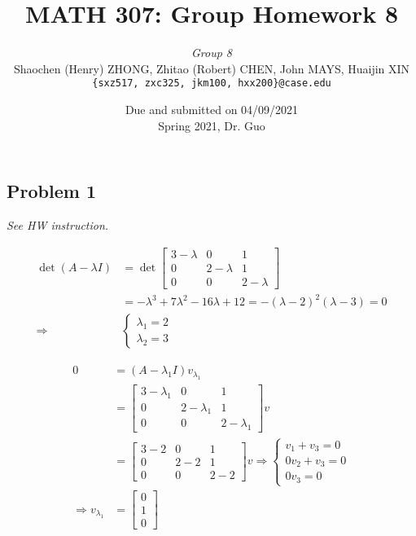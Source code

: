 \documentclass[11pt]{article}
\newcommand{\ilc}{\texttt}
\providecommand{\qbm}[1]{\begin{bmatrix} #1 \end{bmatrix}}
\begin{document}
\title{\textbf{MATH 307: Group Homework 8}}


\author{\textit{Group 8}\\
Shaochen (Henry) ZHONG, Zhitao (Robert) CHEN, John MAYS, Huaijin XIN\\ \ilc{\{sxz517, zxc325, jkm100, hxx200\}@case.edu}}

\date{Due and submitted on 04/09/2021 \\ Spring 2021, Dr. Guo}
\maketitle




\subsection*{Problem 1}
\textit{See HW instruction.}\newline

\begin{align*}
    \det(A - \lambda I) &= \det \qbm{3- \lambda & 0 & 1 \\ 0 & 2-\lambda & 1 \\ 0 & 0 & 2-\lambda} \\
    &= -\lambda^3 + 7 \lambda ^2 - 16\lambda + 12 = -(\lambda - 2)^2 (\lambda - 3) = 0 \\
    \Longrightarrow& \begin{cases}
        \lambda_1 = 2 \\
        \lambda_2 = 3
    \end{cases}
\end{align*}

\begin{align*}
    0 &= (A - \lambda_1 I) v_{\lambda_1} \\
    &= \qbm{3- \lambda_1 & 0 & 1 \\ 0 & 2-\lambda_1 & 1 \\ 0 & 0 & 2-\lambda_1} v \\
    &= \qbm{3- 2 & 0 & 1 \\ 0 & 2-2 & 1 \\ 0 & 0 & 2-2} v \Rightarrow \begin{cases}
        v_1 + v_3 = 0 \\
        0v_2 + v_3 = 0 \\
        0v_3 = 0
    \end{cases} \\
    \Longrightarrow v_{\lambda_1} &= \qbm{0 \\ 1 \\ 0}
\end{align*}
\end{document}
